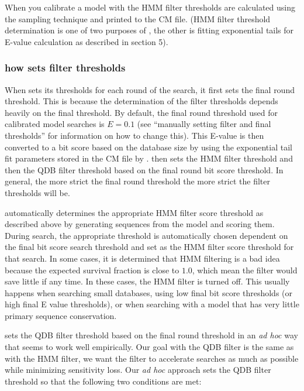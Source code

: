 When you calibrate a model with  the HMM filter
thresholds are calculated using the sampling technique and printed to
the CM file. (HMM filter threshold determination is one of two
purposes of , the other is fitting exponential tails
for E-value calculation as described in section 5).

\subsubsection{how  sets filter thresholds}
When  sets its thresholds for each round of the
search, it first sets the final round threshold. This is because the
determination of the filter thresholds depends heavily on the final
threshold. By default, the final round threshold used for calibrated
model searches is $E=0.1$ (see ``manually setting filter and final
thresholds'' for information on how to change this). 
This E-value is then converted to a bit score based on the database
size by using the exponential tail fit parameters stored in the CM
file by .  then sets the HMM filter
threshold and then the QDB filter threshold based on the final round
bit score threshold. In general, the more strict the final round
threshold the more strict the filter thresholds will be. 

 automatically determines the appropriate HMM filter
score threshold as described above by generating sequences from the
model and scoring them.  During search, the appropriate threshold is
automatically chosen dependent on the final bit score search threshold
and set as the HMM filter score threshold for that search.
In some cases, it is determined that HMM filtering is a
bad idea because the expected survival fraction is close to $1.0$,
which mean the filter would save little if any time. In these cases,
the HMM filter is turned off. This usually happens when searching
small databases, using low final bit score thresholds (or high final E
value thresholds), or when searching with a model that has very little
primary sequence conservation.

 sets the QDB filter threshold based on the final round
threshold in an \emph{ad hoc} way that seems to work well
empirically. Our goal with the QDB filter is the same as with the HMM
filter, we want the filter to accelerate searches as much as possible
while minimizing sensitivity loss. Our \emph{ad hoc} approach 
sets the QDB filter threshold so that the following two conditions are
met:

